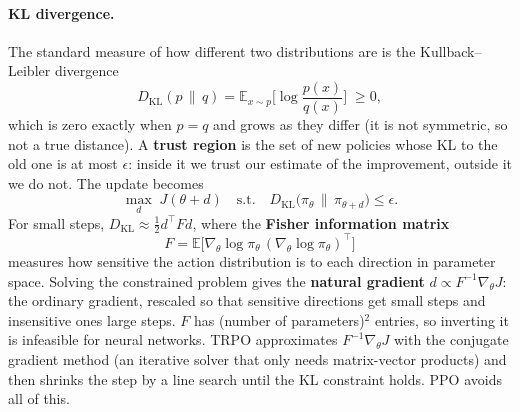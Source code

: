 \documentclass[11pt,a4paper]{article}
\newcommand{\E}{\mathbb{E}}
\newcommand{\pit}{\pi_\theta}
\newcommand{\gradt}{\nabla_\theta}
\newcommand{\KL}{D_{\mathrm{KL}}}
\begin{document}
\paragraph{KL divergence.} The standard measure of how different two distributions are is the Kullback--Leibler divergence
\[
  \KL(p\,\|\,q) = \E_{x\sim p}\Big[\log\frac{p(x)}{q(x)}\Big] \;\ge 0,
\]
which is zero exactly when $p=q$ and grows as they differ (it is not symmetric, so not a true distance). A \textbf{trust region} is the set of new policies whose KL to the old one is at most $\epsilon$: inside it we trust our estimate of the improvement, outside it we do not. The update becomes
\begin{equation}
  \max_d\; J(\theta+d)\quad\text{s.t.}\quad \KL\big(\pi_\theta\,\|\,\pi_{\theta+d}\big)\le\epsilon .
\end{equation}
For small steps, $\KL\approx\frac12 d^\top F d$, where the \textbf{Fisher information matrix}
\[F=\E\big[\gradt\log\pit\,(\gradt\log\pit)^\top\big]\]
measures how sensitive the action distribution is to each direction in parameter space. Solving the constrained problem gives the \textbf{natural gradient} $d\propto F^{-1}\gradt J$: the ordinary gradient, rescaled so that sensitive directions get small steps and insensitive ones large steps. $F$ has (number of parameters)$^2$ entries, so inverting it is infeasible for neural networks. TRPO approximates $F^{-1}\gradt J$ with the conjugate gradient method (an iterative solver that only needs matrix-vector products) and then shrinks the step by a line search until the KL constraint holds. PPO avoids all of this.
\end{document}
